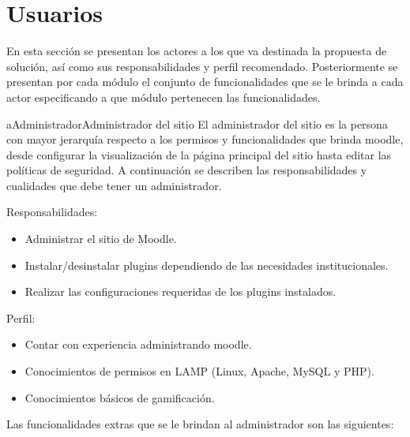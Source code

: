 \section{Usuarios}
\label{analisis:usuarios}

 En esta sección se presentan los actores a los que va destinada la propuesta de
 solución, así como sus responsabilidades y perfil recomendado. Posteriormente se
 presentan por cada módulo el conjunto de funcionalidades que se le brinda a
 cada actor especificando a que módulo pertenecen las funcionalidades.


    \begin{actor}{aAdministrador}{Administrador del sitio}{%
    El administrador del sitio es la persona con mayor jerarquía respecto a los
    permisos y funcionalidades que brinda moodle, desde configurar la visualización
    de la página principal del sitio hasta editar las políticas de seguridad. A
    continuación se describen las responsabilidades y cualidades que debe tener
    un administrador.}

    \item[Responsabilidades:] \hfill
        \begin{itemize}
        \item Administrar el sitio de Moodle.
        \item Instalar/desinstalar plugins dependiendo de las necesidades
              institucionales.
        \item Realizar las configuraciones requeridas de los plugins instalados.
        \end{itemize}

    \item[Perfil:] \hfill
        \begin{itemize}
        \item Contar con experiencia administrando moodle.
        \item Conocimientos de permisos en LAMP (Linux, Apache, MySQL y PHP).
        \item Conocimientos básicos de gamificación.\\
        \end{itemize}
    \end{actor}

    \noindent
    Las funcionalidades extras que se le brindan al administrador son las
    siguientes:

